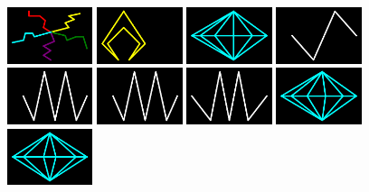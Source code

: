 \begin{figure}[H]
    \includegraphics[width=2.5cm]{preface/vector_images/vec_image_fuse3.png}
    \includegraphics[width=2.5cm]{preface/vector_images/vec_image_lifey.png}
    \includegraphics[width=2.5cm]{preface/vector_images/vec_image_msauce.png}
    \includegraphics[width=2.5cm]{preface/vector_images/vec_image_puls1.png}
    \includegraphics[width=2.5cm]{preface/vector_images/vec_image_puls2.png}
    \includegraphics[width=2.5cm]{preface/vector_images/vec_image_puls3.png}
    \includegraphics[width=2.5cm]{preface/vector_images/vec_image_puls4.png}
    \includegraphics[width=2.5cm]{preface/vector_images/vec_image_sa2pic.png}
    \includegraphics[width=2.5cm]{preface/vector_images/vec_image_sa3pic.png}

\end{figure}
